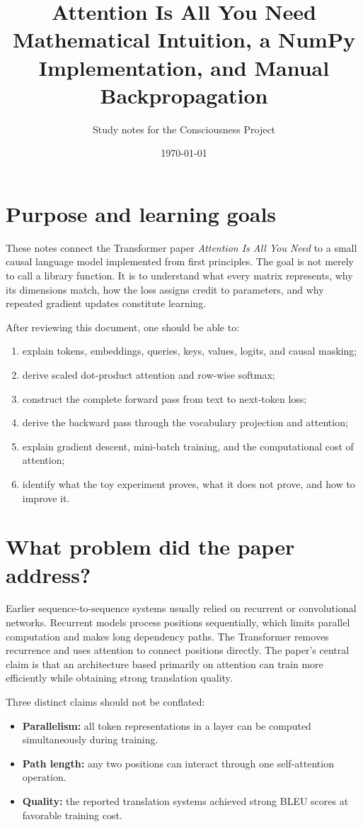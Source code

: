 \documentclass[11pt]{article}
\title{Attention Is All You Need\\
\large Mathematical Intuition, a NumPy Implementation, and Manual Backpropagation}
\author{Study notes for the Consciousness Project}
\date{\today}
\begin{document}
\maketitle
\tableofcontents
\newpage

\section{Purpose and learning goals}

These notes connect the Transformer paper \emph{Attention Is All You Need} \cite{vaswani2017attention}
to a small causal language model implemented from first principles. The goal is not merely to call a
library function. It is to understand what every matrix represents, why its dimensions match, how the
loss assigns credit to parameters, and why repeated gradient updates constitute learning.

After reviewing this document, one should be able to:
\begin{enumerate}
  \item explain tokens, embeddings, queries, keys, values, logits, and causal masking;
  \item derive scaled dot-product attention and row-wise softmax;
  \item construct the complete forward pass from text to next-token loss;
  \item derive the backward pass through the vocabulary projection and attention;
  \item explain gradient descent, mini-batch training, and the computational cost of attention;
  \item identify what the toy experiment proves, what it does not prove, and how to improve it.
\end{enumerate}

\section{What problem did the paper address?}

Earlier sequence-to-sequence systems usually relied on recurrent or convolutional networks. Recurrent
models process positions sequentially, which limits parallel computation and makes long dependency paths.
The Transformer removes recurrence and uses attention to connect positions directly. The paper's central
claim is that an architecture based primarily on attention can train more efficiently while obtaining
strong translation quality.

Three distinct claims should not be conflated:
\begin{itemize}
  \item \textbf{Parallelism:} all token representations in a layer can be computed simultaneously during training.
  \item \textbf{Path length:} any two positions can interact through one self-attention operation.
  \item \textbf{Quality:} the reported translation systems achieved strong BLEU scores at favorable training cost.
\end{itemize}
\end{document}
